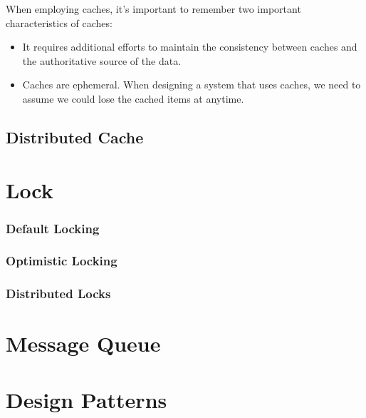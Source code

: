 \documentclass[letterpaper, oneside]{book}
\theoremstyle{definition}
\theoremstyle{remark}
\begin{document}
When employing caches, it's important to remember two important characteristics of caches:
\begin{itemize}
    \item It requires additional efforts to maintain the consistency between caches and the authoritative source of the data.
    \item Caches are ephemeral. When designing a system that uses caches, we need to assume we could lose the cached items at anytime.
\end{itemize}

\section{Distributed Cache}


\chapter{Lock}

\subsection{Default Locking}

\subsection{Optimistic Locking}

\subsection{Distributed Locks}

\chapter{Message Queue}


\chapter{Design Patterns}
\end{document}
